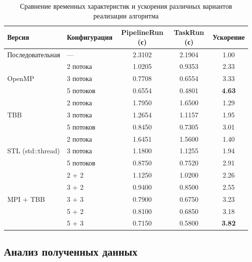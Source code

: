 \documentclass[a4paper,12pt]{article}
\begin{document}
\renewcommand{\arraystretch}{1.3}
\begin{table}[H]
\centering
\footnotesize
\begin{tabularx}{\textwidth}{|X|l|c|c|c|}
\hline
\textbf{Версия} & \textbf{Конфигурация} & \textbf{PipelineRun (с)} & \textbf{TaskRun (с)} & \textbf{Ускорение} \\
\hline
Последовательная & — & 2.3102 & 2.1904 & 1.00 \\
\hline
\multirow{3}{*}{OpenMP} 
  & 2 потока & 1.0205 & 0.9353 & 2.33 \\
  & 3 потока & 0.7708 & 0.6554 & 3.33 \\
  & 5 потоков & 0.6554 & 0.4801 & \textbf{4.63} \\
\hline
\multirow{3}{*}{TBB} 
  & 2 потока & 1.7950 & 1.6500 & 1.29 \\
  & 3 потока & 1.2654 & 1.1157 & 1.95 \\
  & 5 потоков & 0.8450 & 0.7305 & 3.01 \\
\hline
\multirow{3}{*}{STL (std::thread)} 
  & 2 потока & 1.6451 & 1.5600 & 1.40 \\
  & 3 потока & 1.1800 & 1.1255 & 1.94 \\
  & 5 потоков & 0.8750 & 0.7520 & 2.91 \\
\hline
\multirow{5}{*}{MPI + TBB} 
  & 2 + 2 & 1.1250 & 1.0200 & 2.26 \\
  & 3 + 2 & 0.9400 & 0.8500 & 2.55 \\
  & 3 + 3 & 0.7900 & 0.6750 & 3.23 \\
  & 5 + 2 & 0.8100 & 0.6850 & 3.18 \\
  & 5 + 3 & 0.7150 & 0.5800 & \textbf{3.82} \\
\hline
\end{tabularx}
\caption{Сравнение временных характеристик и ускорения различных вариантов реализации алгоритма}
\end{table}

\subsection{Анализ полученных данных}
\end{document}
